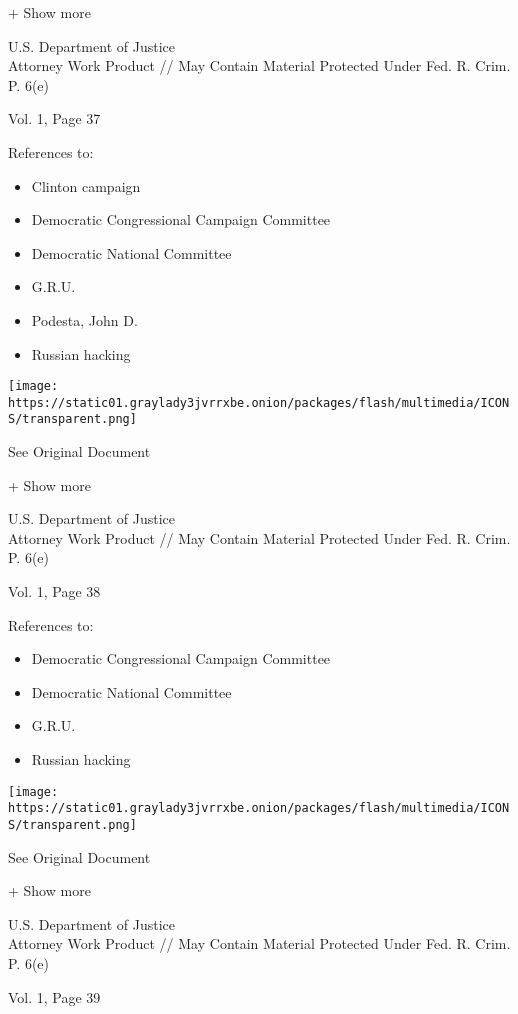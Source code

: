 + Show more

U.S. Department of Justice\\
Attorney Work Product // May Contain Material Protected Under Fed. R.
Crim. P. 6(e)

Vol. 1, Page 37

References to:

\begin{itemize}
\tightlist
\item
  Clinton campaign
\item
  Democratic Congressional Campaign Committee
\item
  Democratic National Committee
\item
  G.R.U.
\item
  Podesta, John D.
\item
  Russian hacking
\end{itemize}

\protect\hyperlink{}{}

\texttt{[image: https://static01.graylady3jvrrxbe.onion/packages/flash/multimedia/ICONS/transparent.png]}

See Original Document

+ Show more

U.S. Department of Justice\\
Attorney Work Product // May Contain Material Protected Under Fed. R.
Crim. P. 6(e)

Vol. 1, Page 38

References to:

\begin{itemize}
\tightlist
\item
  Democratic Congressional Campaign Committee
\item
  Democratic National Committee
\item
  G.R.U.
\item
  Russian hacking
\end{itemize}

\protect\hyperlink{}{}

\texttt{[image: https://static01.graylady3jvrrxbe.onion/packages/flash/multimedia/ICONS/transparent.png]}

See Original Document

+ Show more

U.S. Department of Justice\\
Attorney Work Product // May Contain Material Protected Under Fed. R.
Crim. P. 6(e)

Vol. 1, Page 39

